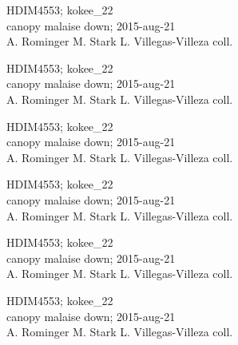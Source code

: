 \documentclass[2pt]{extarticle}
\begin{document}
\noindent
\parbox{0.16\textwidth}{\tiny \raggedright \rule[-0.3\baselineskip]{0pt}{10pt}HDIM4553; kokee\_22\\ canopy malaise down; 2015-aug-21\\ A. Rominger M. Stark L. Villegas-Villeza coll.}
\parbox{0.16\textwidth}{\tiny \raggedright \rule[-0.3\baselineskip]{0pt}{10pt}HDIM4553; kokee\_22\\ canopy malaise down; 2015-aug-21\\ A. Rominger M. Stark L. Villegas-Villeza coll.}
\parbox{0.16\textwidth}{\tiny \raggedright \rule[-0.3\baselineskip]{0pt}{10pt}HDIM4553; kokee\_22\\ canopy malaise down; 2015-aug-21\\ A. Rominger M. Stark L. Villegas-Villeza coll.}
\parbox{0.16\textwidth}{\tiny \raggedright \rule[-0.3\baselineskip]{0pt}{10pt}HDIM4553; kokee\_22\\ canopy malaise down; 2015-aug-21\\ A. Rominger M. Stark L. Villegas-Villeza coll.}
\parbox{0.16\textwidth}{\tiny \raggedright \rule[-0.3\baselineskip]{0pt}{10pt}HDIM4553; kokee\_22\\ canopy malaise down; 2015-aug-21\\ A. Rominger M. Stark L. Villegas-Villeza coll.}
\parbox{0.16\textwidth}{\tiny \raggedright \rule[-0.3\baselineskip]{0pt}{10pt}HDIM4553; kokee\_22\\ canopy malaise down; 2015-aug-21\\ A. Rominger M. Stark L. Villegas-Villeza coll.} \\ 
\vspace{0.001in} 
\end{document}
